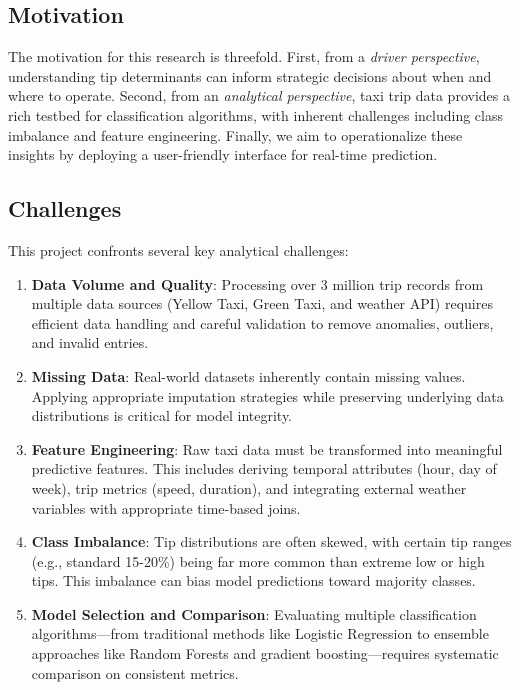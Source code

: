 \documentclass[11pt]{article}
\begin{document}
\subsection{Motivation}

The motivation for this research is threefold. First, from a \textit{driver perspective}, understanding tip determinants can inform strategic decisions about when and where to operate. Second, from an \textit{analytical perspective}, taxi trip data provides a rich testbed for classification algorithms, with inherent challenges including class imbalance and feature engineering. Finally, we aim to operationalize these insights by deploying a user-friendly interface for real-time prediction.
\subsection{Challenges}

This project confronts several key analytical challenges:

\begin{enumerate}
    \item \textbf{Data Volume and Quality}: Processing over 3 million trip records from multiple data sources (Yellow Taxi, Green Taxi, and weather API) requires efficient data handling and careful validation to remove anomalies, outliers, and invalid entries.

    \item \textbf{Missing Data}: Real-world datasets inherently contain missing values. Applying appropriate imputation strategies while preserving underlying data distributions is critical for model integrity.

    \item \textbf{Feature Engineering}: Raw taxi data must be transformed into meaningful predictive features. This includes deriving temporal attributes (hour, day of week), trip metrics (speed, duration), and integrating external weather variables with appropriate time-based joins.

    \item \textbf{Class Imbalance}: Tip distributions are often skewed, with certain tip ranges (e.g., standard 15-20\%) being far more common than extreme low or high tips. This imbalance can bias model predictions toward majority classes.

    \item \textbf{Model Selection and Comparison}: Evaluating multiple classification algorithms—from traditional methods like Logistic Regression to ensemble approaches like Random Forests and gradient boosting—requires systematic comparison on consistent metrics.
\end{enumerate}
\end{document}
